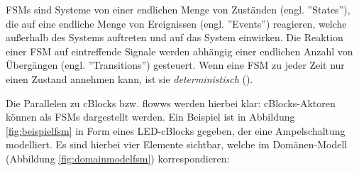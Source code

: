 \acp{FSM} sind Systeme von einer endlichen Menge von Zuständen (engl. ''States''), die auf eine endliche Menge von Ereignissen (engl. ''Events'') reagieren, welche außerhalb des Systems auftreten und auf das System einwirken. Die Reaktion einer \ac{FSM} auf eintreffende Signale werden abhängig einer endlichen Anzahl von Übergängen (engl. ''Transitions'') gesteuert. Wenn eine \ac{FSM} zu jeder Zeit nur einen Zustand annehmen kann, ist sie \textit{deterministisch} (\cite{hopcroft2013introduction}). 

Die Parallelen zu cBlocks bzw. flowws werden hierbei klar: cBlocks-Aktoren können als \acp{FSM} dargestellt werden. Ein Beispiel ist in Abbildung \ref{fig:beispielfsm} in Form eines LED-cBlocks gegeben, der eine Ampelschaltung modelliert. Es sind hierbei vier Elemente sichtbar, welche im Domänen-Modell (Abbildung \ref{fig:domainmodelfsm}) korrespondieren:
